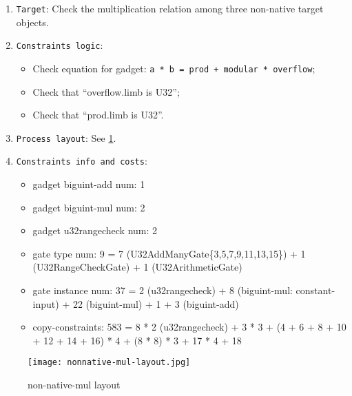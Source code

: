 
\begin{enumerate}
    \item \verb|Target|: Check the multiplication relation among three non-native target objects.
    \item \verb|Constraints logic|:
    \begin{itemize}
        \item Check equation for gadget: \verb|a * b = prod + modular * overflow|;
        \item Check that ``overflow.limb is U32'';
        \item Check that ``prod.limb is U32''.
    \end{itemize}
    \item \verb|Process layout|: See \ref{fig:non-native-mul-layout}.
    \item \verb|Constraints info and costs|:
    \begin{itemize}
        \item gadget biguint-add num: 1
        \item gadget biguint-mul num: 2
        \item gadget u32rangecheck num: 2
        \item gate type num: 9 = 7 (U32AddManyGate\{3,5,7,9,11,13,15\}) + 1 (U32RangeCheckGate) + 1 (U32ArithmeticGate)
        \item gate instance num: 37 = 2 (u32rangecheck) + 8 (biguint-mul: constant-input) + 22 (biguint-mul) + 1 + 3 (biguint-add)
        \item copy-constraints: 583 = 8 * 2 (u32rangecheck) + 3 * 3 + (4 + 6 + 8 + 10 + 12 + 14 + 16) * 4 + (8 * 8) * 3 + 17 * 4 + 18
    \end{itemize}
\end{enumerate}

\begin{figure}[!ht]
    \centering
    \texttt{[image: nonnative-mul-layout.jpg]}
    \caption{non-native-mul layout}
    \label{fig:non-native-mul-layout}
\end{figure}